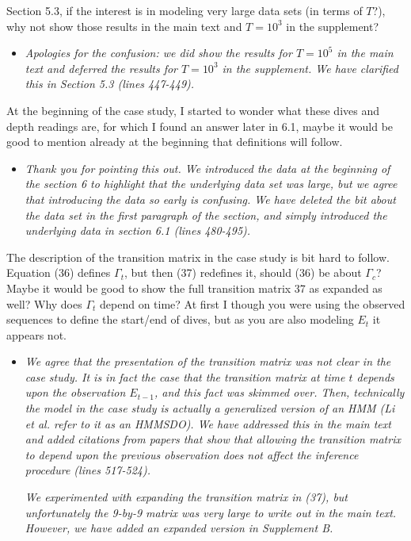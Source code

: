 \documentclass[11pt]{article}
\begin{document}
Section 5.3, if the interest is in modeling very large data sets (in terms of $T$?), why not show those results in the main text and $T=10^3$ in the supplement?

\begin{itemize}
    \item \textit{Apologies for the confusion: we did show the results for $T=10^5$ in the main text and deferred the results for $T = 10^3$ in the supplement. We have clarified this in Section 5.3 (lines 447-449).}
\end{itemize}

At the beginning of the case study, I started to wonder what these dives and depth readings are, for which I found an answer later in 6.1, maybe it would be good to mention already at the beginning that definitions will follow.

\begin{itemize}
    \item \textit{Thank you for pointing this out. We introduced the data at the beginning of the section 6 to highlight that the underlying data set was large, but we agree that introducing the data so early is confusing. We have deleted the bit about the data set in the first paragraph of the section, and simply introduced the underlying data in section 6.1 (lines 480-495).}
\end{itemize}

The description of the transition matrix in the case study is bit hard to follow. Equation (36) defines $\Gamma_t$, but then (37) redefines it, should (36) be about $\Gamma_c$? Maybe it would be good to show the full transition matrix 37 as expanded as well? Why does $\Gamma_t$ depend on time? At first I though you were using the observed sequences to define the start/end of dives, but as you are also modeling $E_t$ it appears not. 

\begin{itemize}
    \item \textit{We agree that the presentation of the transition matrix was not clear in the case study. It is in fact the case that the transition matrix at time $t$ depends upon the observation $E_{t-1}$, and this fact was skimmed over. Then, technically the model in the case study is actually a generalized version of an HMM (Li et al. refer to it as an HMMSDO). We have addressed this in the main text and added citations from papers that show that allowing the transition matrix to depend upon the previous observation does not affect the inference procedure (lines 517-524).}
    
    \textit{We experimented with expanding the transition matrix in (37), but unfortunately the 9-by-9 matrix was very large to write out in the main text. However, we have added an expanded version in Supplement B.}
\end{itemize}

%
\end{document}
